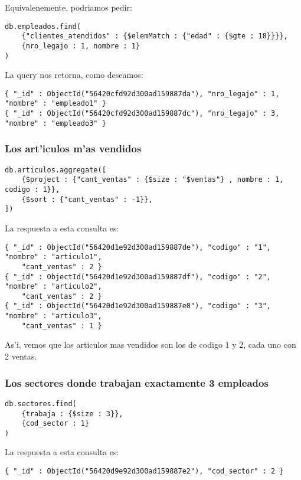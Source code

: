 Equivalenemente, podriamos pedir:

\begin{verbatim}
db.empleados.find(
    {"clientes_atendidos" : {$elemMatch : {"edad" : {$gte : 18}}}},
    {nro_legajo : 1, nombre : 1}
)
\end{verbatim}

La query nos retorna, como deseamos:

\begin{verbatim}
{ "_id" : ObjectId("56420cfd92d300ad159887da"), "nro_legajo" : 1, "nombre" : "empleado1" }
{ "_id" : ObjectId("56420cfd92d300ad159887dc"), "nro_legajo" : 3, "nombre" : "empleado3" }
\end{verbatim}

\subsubsection{Los art'iculos m'as vendidos}

\begin{verbatim}
db.articulos.aggregate([
    {$project : {"cant_ventas" : {$size : "$ventas"} , nombre : 1, codigo : 1}},
    {$sort : {"cant_ventas" : -1}},
])
\end{verbatim}

La respuesta a esta consulta es:

\begin{verbatim}
{ "_id" : ObjectId("56420d1e92d300ad159887de"), "codigo" : "1", "nombre" : "articulo1",
    "cant_ventas" : 2 }
{ "_id" : ObjectId("56420d1e92d300ad159887df"), "codigo" : "2", "nombre" : "articulo2",
    "cant_ventas" : 2 }
{ "_id" : ObjectId("56420d1e92d300ad159887e0"), "codigo" : "3", "nombre" : "articulo3",
    "cant_ventas" : 1 }
\end{verbatim}

As'i, vemos que los articulos mas vendidos son los de codigo 1 y 2, cada uno con 2 ventas.


\subsubsection{Los sectores donde trabajan exactamente 3 empleados}

\begin{verbatim}
db.sectores.find(
    {trabaja : {$size : 3}},
    {cod_sector : 1}
)
\end{verbatim}

La respuesta a esta consulta es:

\begin{verbatim}
{ "_id" : ObjectId("56420d9e92d300ad159887e2"), "cod_sector" : 2 }
\end{verbatim}

